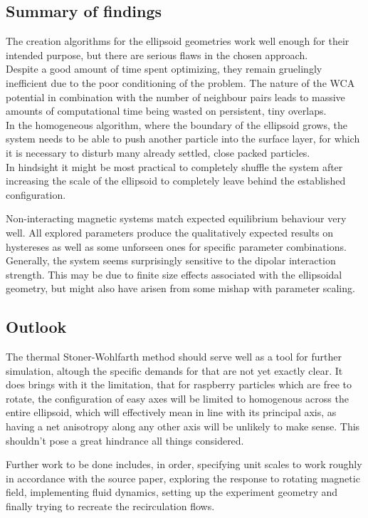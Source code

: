 \documentclass[12pt, DIV=12]{scrartcl}
\begin{document}
\subsection{Summary of findings}
The creation algorithms for the ellipsoid geometries work well enough for their intended purpose, but there are serious flaws in the chosen approach.\\
Despite a good amount of time spent optimizing, they remain gruelingly inefficient due to the poor conditioning of the problem. The nature of the WCA potential in combination with the number of neighbour pairs leads to massive amounts of computational time being wasted on persistent, tiny overlaps.\\
In the homogeneous algorithm, where the boundary of the ellipsoid grows, the system needs to be able to push another particle into the surface layer, for which it is necessary to disturb many already settled, close packed particles.\\
In hindsight it might be most practical to completely shuffle the system after increasing the scale of the ellipsoid to completely leave behind the established configuration.

Non-interacting magnetic systems match expected equilibrium behaviour very well.
All explored parameters produce the qualitatively expected results on hystereses as well as some unforseen ones for specific parameter combinations.\\
Generally, the system seems surprisingly sensitive to the dipolar interaction strength. This may be due to finite size effects associated with the ellipsoidal geometry, but might also have arisen from some mishap with parameter scaling.

\subsection{Outlook}
The thermal Stoner-Wohlfarth method should serve well as a tool for further simulation, altough the specific demands for that are not yet exactly clear. It does brings with it the limitation, that for raspberry particles which are free to rotate, the configuration of easy axes will be limited to homogenous across the entire ellipsoid, which will effectively mean in line with its principal axis, as having a net anisotropy along any other axis will be unlikely to make sense. This shouldn't pose a great hindrance all things considered.

Further work to be done includes, in order, specifying unit scales to work roughly in accordance with the source paper, exploring the response to rotating magnetic field, implementing fluid dynamics, setting up the experiment geometry and finally trying to recreate the recirculation flows.
\end{document}
